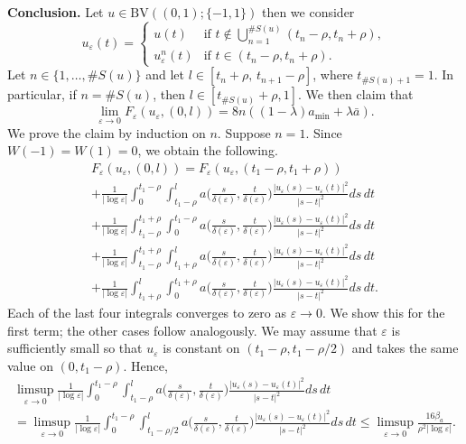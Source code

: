 \documentclass[12pt]{article}
\newcommand{\BV}{\mathrm{BV}}
\numberwithin{equation}{section}
\def\e{\varepsilon}
\begin{document}
\medskip
\noindent \textbf{Conclusion.} Let $u\in\BV((0,1);\{-1,1\})$ then we consider 
\begin{equation*}
u_{\varepsilon}(t)=
    \begin{cases}
        u(t) & \text{if}\,\,t\notin\bigcup_{n=1}^{\#S(u)}(t_{n}-\rho,t_{n}+\rho),\\
        u^{n}_{\varepsilon}(t) & \text{if}\,\,t\in(t_{n}-\rho,t_{n}+\rho).
    \end{cases}
\end{equation*}
Let $n\in\{1,\ldots,\#S(u)\}$ and let $l\in[t_n+\rho,\, t_{n+1}-\rho]$, where $t_{\#S(u)+1}=1$. In particular, if $n=\#S(u)$, then $l\in[t_{\#S(u)}+\rho,1]$. We then claim that
\begin{equation}\label{induction argument}
    \lim_{\varepsilon\to0}F_{\varepsilon}(u_{\varepsilon},(0,l))=8n((1-\lambda)a_{\min}+\lambda\bar{a}).
\end{equation}
We prove the claim by induction on $n$. Suppose $n=1$. Since $W(-1)=W(1)=0$, we obtain the following.
\begin{multline*}
    F_{\varepsilon}(u_{\varepsilon},(0,l))=F_{\varepsilon}(u_{\varepsilon},(t_{1}-\rho,t_{1}+\rho))\\+\frac{1}{\left|\log{\e}\right|}\int_{0}^{t_{1}-\rho}\int_{t_{1}-\rho}^{l}a\big(\frac{s}{\delta(\e) },\frac{t}{\delta(\e) }\big)\frac{\left|u_{\e}(s)-u_{\e}(t)\right|^2}{\left|s-t\right|^2}ds\,dt\\+\frac{1}{\left|\log{\e}\right|}\int_{t_{1}-\rho}^{t_{1}+\rho}\int_{0}^{t_{1}-\rho}a\big(\frac{s}{\delta(\e) },\frac{t}{\delta(\e) }\big)\frac{\left|u_{\e}(s)-u_{\e}(t)\right|^2}{\left|s-t\right|^2}ds\,dt\\+\frac{1}{\left|\log{\e}\right|}\int_{t_{1}-\rho}^{t_{1}+\rho}\int_{t_{1}+\rho}^{l}a\big(\frac{s}{\delta(\e) },\frac{t}{\delta(\e) }\big)\frac{\left|u_{\e}(s)-u_{\e}(t)\right|^2}{\left|s-t\right|^2}ds\,dt\\+\frac{1}{\left|\log{\e}\right|}\int_{t_{1}+\rho}^{l}\int_{0}^{t_{1}+\rho}a\big(\frac{s}{\delta(\e) },\frac{t}{\delta(\e) }\big)\frac{\left|u_{\e}(s)-u_{\e}(t)\right|^2}{\left|s-t\right|^2}ds\,dt.
\end{multline*}
Each of the last four integrals converges to zero as $\varepsilon\to0$. We show this for the first term; the other cases follow analogously.
We may assume that $\varepsilon$ is sufficiently small so that
$u_{\varepsilon}$ is constant on $(t_{1}-\rho,t_{1}-\rho/2)$ and takes the same value on $(0,t_{1}-\rho)$. Hence,
\begin{multline*}
    \limsup_{\e\to0}\frac{1}{\left|\log{\e}\right|}\int_{0}^{t_{1}-\rho}\int_{t_{1}-\rho}^{l}a\big(\frac{s}{\delta(\e) },\frac{t}{\delta(\e) }\big)\frac{\left|u_{\e}(s)-u_{\e}(t)\right|^2}{\left|s-t\right|^2}ds\,dt\\=\limsup_{\e\to0}\frac{1}{\left|\log{\e}\right|}\int_{0}^{t_{1}-\rho}\int_{t_{1}-\rho/2}^{l}a\big(\frac{s}{\delta(\e) },\frac{t}{\delta(\e) }\big)\frac{\left|u_{\e}(s)-u_{\e}(t)\right|^2}{\left|s-t\right|^2}ds\,dt\le\limsup_{\e\to0}\frac{16\beta_{a}}{\rho^{2}\left|\log{\e}\right|}.
\end{multline*}
\end{document}
